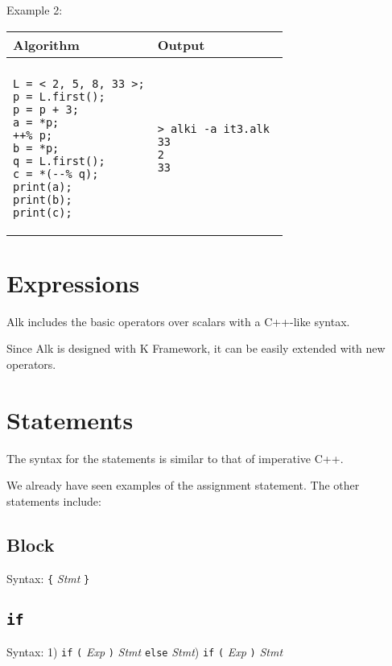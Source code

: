 \documentclass[a4paper]{report}
\begin{document}
Example 2:
\begin{center}
\begin{tabular}{ll}
Algorithm & Output\\
\hline
\\
\begin{minipage}{.45\textwidth}
\begin{verbatim}
L = < 2, 5, 8, 33 >;
p = L.first();
p = p + 3;
a = *p;
++% p;
b = *p;
q = L.first();
c = *(--% q);
print(a);
print(b);
print(c);
\end{verbatim}
\end{minipage}
&
\begin{minipage}{.45\textwidth}
\begin{verbatim}
> alki -a it3.alk 
33
2
33
\end{verbatim}
\end{minipage}
\end{tabular}
\end{center}

\section{Expressions}

Alk includes the basic operators over scalars with a C++-like syntax.

Since Alk is designed with K Framework, it can be easily extended with new operators. 

\section{Statements}

The syntax for the statements is similar to that of imperative C++. 

We already have seen examples of the assignment statement.
The other statements include:

\subsection{Block}

Syntax: \verb'{' {\it Stmt} \verb'}'

\subsection{\texttt{if}}


Syntax: 1) \verb"if" \verb"(" {\it Exp} \verb")" {\it Stmt} \verb"else" {\it Stmt}) \verb"if" \verb"(" {\it Exp} \verb")" {\it Stmt} 
\end{document}
